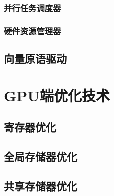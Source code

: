\subsubsection{并行任务调度器}

\subsubsection{硬件资源管理器}

\subsection{向量原语驱动}\label{subsec:vp-driver}

\section{GPU端优化技术}\label{sec:gpu-optimization}

\subsection{寄存器优化}

\subsection{全局存储器优化}

\subsection{共享存储器优化}
